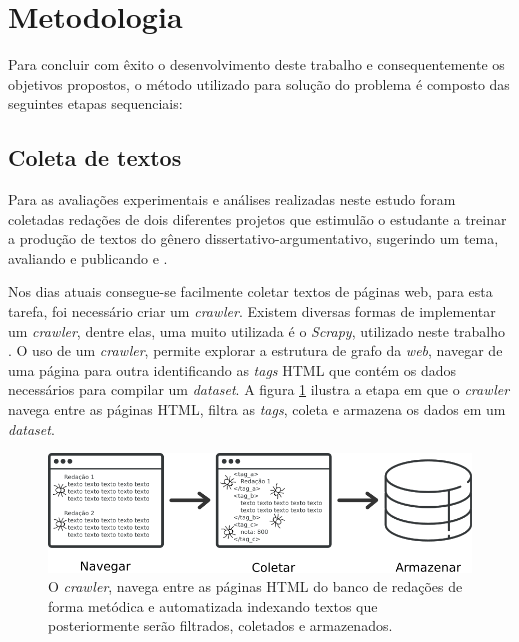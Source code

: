 \section{Metodologia}

Para concluir com êxito o desenvolvimento deste trabalho e consequentemente os 
objetivos propostos, o método utilizado para solução do problema é composto das 
seguintes etapas sequenciais:

\subsection{Coleta de textos}
\label{subsection:coleta_texto}

Para as avaliações experimentais e análises realizadas neste estudo foram 
coletadas redações de dois diferentes projetos que estimulão o estudante a 
treinar a produção de textos do gênero dissertativo-argumentativo, sugerindo 
um tema, avaliando e publicando \cite{brasil_escola} e \cite{uol:2017}. 

Nos dias atuais consegue-se facilmente coletar textos de páginas web, para esta 
tarefa, foi necessário criar um  \textit{crawler}. Existem diversas formas de 
implementar um \textit{crawler}, dentre elas, uma muito utilizada é o 
\textit{Scrapy}, utilizado neste trabalho \cite{scrapy}. O uso de um 
\textit{crawler}, permite explorar a estrutura de grafo da \textit{web}, 
navegar de uma página para outra identificando as \textit{tags} HTML que contém 
os dados necessários para compilar um \textit{dataset}. A figura 
\ref{figure:metodologia_1} ilustra a etapa em que o \textit{crawler} navega 
entre as páginas HTML, filtra as \textit{tags}, coleta e armazena os dados em 
um \textit{dataset}.

\begin{figure}[H]
\begin{center}
    \includegraphics[scale=0.70]{images/metodologia_1.png}
\end{center}
\caption{O \textit{crawler}, navega entre as páginas HTML do banco de redações 
de forma metódica e automatizada indexando textos que posteriormente serão 
filtrados, coletados e armazenados.}
\label{figure:metodologia_1}
\end{figure}

